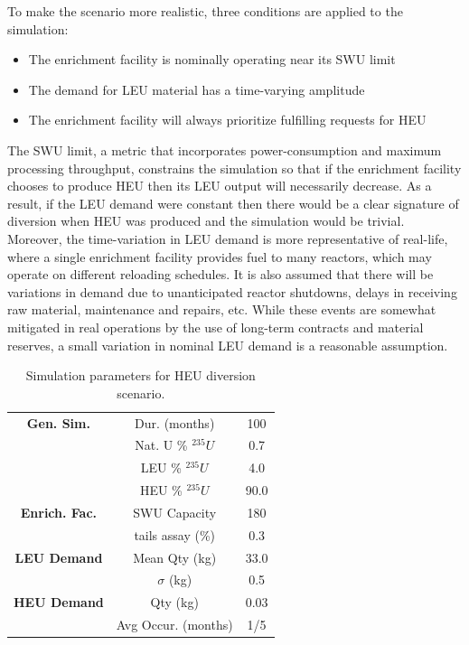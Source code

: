 To make the scenario more realistic, three conditions are applied to the simulation:
\begin{itemize}
\item{The enrichment facility is nominally operating near its \gls{SWU} limit}
\item{The demand for \gls{LEU} material has a time-varying amplitude}
\item{The enrichment facility will always prioritize fulfilling requests for \gls{HEU}}
\end{itemize}
The \gls{SWU} limit, a metric that incorporates power-consumption and maximum processing throughput, constrains the simulation so that if the enrichment facility chooses to produce \gls{HEU} then its \gls{LEU} output will necessarily decrease.  As a result, if the \gls{LEU} demand were constant then there would be a clear signature of diversion when \gls{HEU} was produced and the simulation would be trivial.  Moreover, the time-variation in \gls{LEU} demand is more representative of real-life, where a single enrichment facility provides fuel to many reactors, which may operate on different reloading schedules. It is also assumed that there will be variations in demand due to unanticipated reactor shutdowns, delays in receiving raw material, maintenance and repairs, etc.  While these events are somewhat mitigated in real operations by the use of long-term contracts and material reserves, a small variation in nominal \gls{LEU} demand is a reasonable assumption.

\begin{table}
\centering
\begin{tabular}{|c|c|c|}
\hline
\textbf{Gen. Sim.} & Dur. (months)      & 100  \\
                    & Nat. U \% $^{235}U$ & 0.7  \\
                    & LEU \% $^{235}U$    & 4.0  \\
                    & HEU \% $^{235}U$    & 90.0 \\
\hline
\textbf{Enrich. Fac.} & SWU Capacity       & 180  \\
                    & tails assay (\%)   & 0.3  \\
\hline
\textbf{LEU Demand} & Mean Qty (kg)       & 33.0  \\
                    & $\sigma$ (kg)       & 0.5  \\
\hline
\textbf{HEU Demand} & Qty (kg)            & 0.03  \\
                    & Avg Occur. (months) & 1/5 \\ 
\hline
\end{tabular}
\caption{Simulation parameters for \gls{HEU} diversion scenario.}
\label{tab:sim_params}
\end{table}

